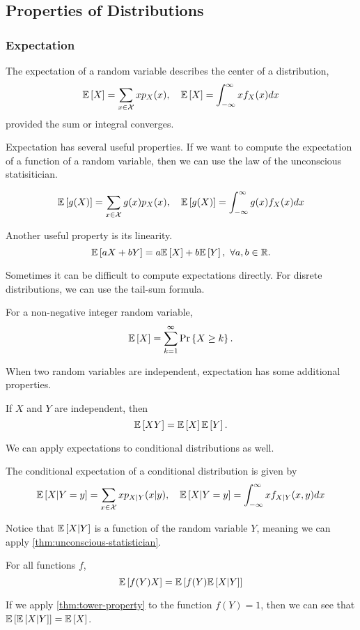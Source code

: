 \subsection{Properties of Distributions}
\subsubsection{Expectation}
\begin{definition}
  The expectation of a random variable describes the center of a distribution,
  \[
	\mathbb{E}\left[X\right]=\sum_{x\in\mathcal{X}}xp_X(x), \quad \mathbb{E}\left[X\right] = \int_{-\infty}^{\infty}xf_X(x)dx
  \]
  provided the sum or integral converges.
  \label{defn:drv-expectation}
\end{definition}
Expectation has several useful properties.
If we want to compute the expectation of a function of a random variable, then we can use the law of the unconscious statisitician.
\begin{theorem}
  \[
	\mathbb{E}\left[g(X)\right] = \sum_{x\in\mathcal{X}}g(x)p_X(x), \quad \mathbb{E}\left[g(X)\right] = \int_{-\infty}^{\infty}g(x)f_X(x)dx
  \]
  \label{thm:unconscious-statistician}
\end{theorem}
Another useful property is its linearity.
\[
  \expect{aX+bY} = a\expect{X}+b\expect{Y},\ \forall a, b\in\mathbb{R}.
\]

Sometimes it can be difficult to compute expectations directly. For disrete distributions, we can use the tail-sum formula.
\begin{theorem}
  For a non-negative integer random variable,
  \[
	\mathbb{E}\left[X\right] = \sum_{k=1}^{\infty}\text{Pr}\left\{X\geq k\right\}.
  \]
  \label{thm:tail-sum}
\end{theorem}
When two random variables are independent, expectation has some additional properties.
\begin{theorem}
  If $X$ and $Y$ are independent, then
  \[
	\mathbb{E}\left[XY\right] = \mathbb{E}\left[X\right]\mathbb{E}\left[Y\right].
  \]
  \label{thm:indep-expect}
\end{theorem}
We can apply expectations to conditional distributions as well.
\begin{definition}
  The conditional expectation of a conditional distribution is given by
  \[
	\mathbb{E}\left[X|Y=y\right] = \sum_{x\in\mathcal{X}}xp_{X|Y}(x|y), \quad \mathbb{E}\left[X|Y=y\right] = \int_{-\infty}^{\infty}xf_{X|Y}(x, y)dx
  \]
  \label{defn:drv-conditional-expect}
\end{definition}
Notice that $\mathbb{E}\left[X|Y\right]$ is a function of the random variable $Y$, meaning we can apply \cref{thm:unconscious-statistician}.
\begin{theorem}
  For all functions $f$,
  \[
	\mathbb{E}\left[f(Y)X\right] = \mathbb{E}\left[f(Y)\mathbb{E}\left[X|Y\right]\right]
  \]
  \label{thm:tower-property}
\end{theorem}
If we apply \cref{thm:tower-property} to the function $f(Y) = 1$, then we can see that $\mathbb{E}\left[\mathbb{E}\left[X|Y\right]\right] = \mathbb{E}\left[X\right]$.

